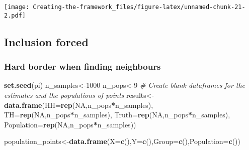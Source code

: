 \documentclass[
]{article}
\newenvironment{Shaded}{\begin{snugshade}}{\end{snugshade}}
\newcommand{\AttributeTok}[1]{\textcolor[rgb]{0.13,0.29,0.53}{#1}}
\newcommand{\CommentTok}[1]{\textcolor[rgb]{0.56,0.35,0.01}{\textit{#1}}}
\newcommand{\ConstantTok}[1]{\textcolor[rgb]{0.56,0.35,0.01}{#1}}
\newcommand{\DecValTok}[1]{\textcolor[rgb]{0.00,0.00,0.81}{#1}}
\newcommand{\FunctionTok}[1]{\textcolor[rgb]{0.13,0.29,0.53}{\textbf{#1}}}
\newcommand{\NormalTok}[1]{#1}
\newcommand{\OtherTok}[1]{\textcolor[rgb]{0.56,0.35,0.01}{#1}}
\newcommand{\SpecialCharTok}[1]{\textcolor[rgb]{0.81,0.36,0.00}{\textbf{#1}}}
\begin{document}
\texttt{[image: Creating-the-framework\_files/figure-latex/unnamed-chunk-21-2.pdf]}

\subsection{Inclusion forced}\label{inclusion-forced}

\subsubsection{Hard border when finding
neighbours}\label{hard-border-when-finding-neighbours-1}

\begin{Shaded}
\begin{Highlighting}[]
\FunctionTok{set.seed}\NormalTok{(pi)}
\NormalTok{n\_samples}\OtherTok{\textless{}{-}}\DecValTok{1000}
\NormalTok{n\_pops}\OtherTok{\textless{}{-}}\DecValTok{9}
\CommentTok{\# Create blank dataframes for the estimates and the populations of points}
\NormalTok{results}\OtherTok{\textless{}{-}}\FunctionTok{data.frame}\NormalTok{(}\AttributeTok{HH=}\FunctionTok{rep}\NormalTok{(}\ConstantTok{NA}\NormalTok{,n\_pops}\SpecialCharTok{*}\NormalTok{n\_samples),}
                    \AttributeTok{TH=}\FunctionTok{rep}\NormalTok{(}\ConstantTok{NA}\NormalTok{,n\_pops}\SpecialCharTok{*}\NormalTok{n\_samples),}
                    \AttributeTok{Truth=}\FunctionTok{rep}\NormalTok{(}\ConstantTok{NA}\NormalTok{,n\_pops}\SpecialCharTok{*}\NormalTok{n\_samples),}
                    \AttributeTok{Population=}\FunctionTok{rep}\NormalTok{(}\ConstantTok{NA}\NormalTok{,n\_pops}\SpecialCharTok{*}\NormalTok{n\_samples))}

\NormalTok{population\_points}\OtherTok{\textless{}{-}}\FunctionTok{data.frame}\NormalTok{(}\AttributeTok{X=}\FunctionTok{c}\NormalTok{(),}\AttributeTok{Y=}\FunctionTok{c}\NormalTok{(),}\AttributeTok{Group=}\FunctionTok{c}\NormalTok{(),}\AttributeTok{Population=}\FunctionTok{c}\NormalTok{())}


\end{Highlighting}
\end{Shaded}
\end{document}
